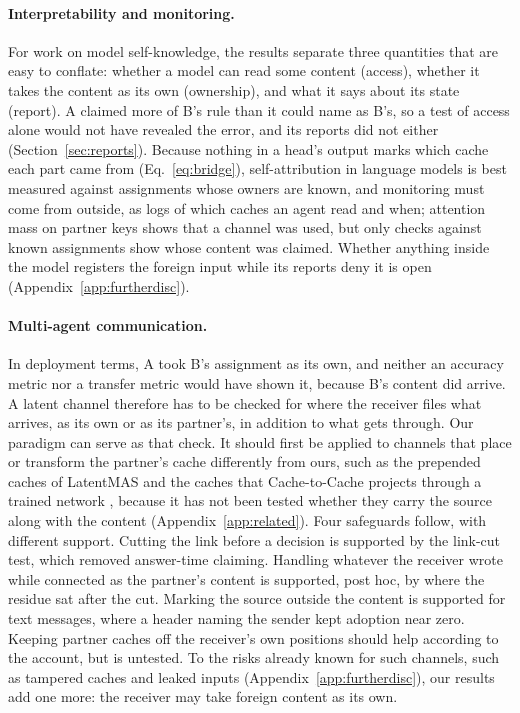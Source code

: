 \paragraph{Interpretability and monitoring.} For work on model
self-knowledge, the results separate three quantities that are easy to
conflate: whether a model can read some content (access), whether it
takes the content as its own (ownership), and what it says about its
state (report). A claimed more of B's rule than it could name as B's,
so a test of access alone would not have revealed the error, and its
reports did not either (Section~\ref{sec:reports}). Because nothing in a
head's output marks which cache each part came from
(Eq.~\ref{eq:bridge}), self-attribution in language models is best
measured against assignments whose owners are known, and monitoring must
come from outside, as logs of which caches an agent read and when;
attention mass on partner keys shows that a channel was used, but only
checks against known assignments show whose content was claimed. Whether anything inside the model
registers the foreign input while its reports deny it is open
(Appendix~\ref{app:furtherdisc}).

\paragraph{Multi-agent communication.} In deployment terms, A took B's
assignment as its own, and neither an accuracy metric nor a transfer
metric would have shown it, because B's content did arrive. A latent channel therefore
has to be checked for where the receiver files what arrives, as its own
or as its partner's, in addition to what gets through. Our paradigm
can serve as that check. It should first be applied to channels that
place or transform the partner's cache differently from ours, such as
the prepended caches of LatentMAS \citep{zou2026latentmas} and the
caches that Cache-to-Cache projects through a trained network
\citep{fu2026cache}, because it has not been tested whether they carry
the source along with the content (Appendix~\ref{app:related}). Four
safeguards follow, with different support. Cutting the link before a
decision is supported by the link-cut test, which removed answer-time claiming.
Handling whatever the receiver wrote while connected as the partner's
content is supported, post hoc, by where the residue sat after the cut.
Marking the source outside the content is supported for text messages,
where a header naming the sender kept adoption near zero. Keeping partner
caches off the receiver's own positions should help according to the
account, but is untested. To the risks already known for such channels, such as
tampered caches and leaked inputs (Appendix~\ref{app:furtherdisc}), our
results add one more: the receiver may take foreign content as its own.

